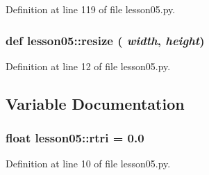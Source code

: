 Definition at line 119 of file lesson05.py.
\subsubsection{\setlength{\rightskip}{0pt plus 5cm}def lesson05::resize ( {\em width},  {\em height})}\label{namespacelesson05_353e92e1256de11f408da590afdd94ea}




Definition at line 12 of file lesson05.py.

\subsection{Variable Documentation}
\subsubsection{\setlength{\rightskip}{0pt plus 5cm}float {\bf lesson05::rtri} = 0.0\hspace{0.3cm}{\tt  [static]}}\label{namespacelesson05_6b7e999f58ceb7b2e93625e54810685d}




Definition at line 10 of file lesson05.py.